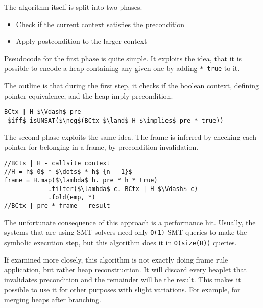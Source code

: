 \documentclass[sigplan,screen,review]{acmart}
\begin{document}
\begin{prooftree}
\end{prooftree}

The algorithm itself is split into two phases. 

\begin{itemize}
    \item Check if the current context satisfies the precondition
    \item Apply postcondition to the larger context
\end{itemize}

Pseudocode for the first phase is quite simple. It exploits the idea, that it is possible to encode a heap containing any given one by adding \texttt{* true} to it. 

The outline is that during the first step, it checks if the boolean context, defining pointer equivalence, and the heap imply precondition.

\begin{lstlisting}[mathescape]
BCtx | H $\Vdash$ pre 
 $iff$ isUNSAT($\neg$(BCtx $\land$ H $\implies$ pre * true))
\end{lstlisting}

The second phase exploits the same idea. The frame is inferred by checking each pointer for belonging in a frame, by precondition invalidation.

\begin{lstlisting}[mathescape]
//BCtx | H - callsite context
//H = h$_0$ * $\dots$ * h$_{n - 1}$
frame = H.map($\lambda$ h. pre * h * true)
            .filter($\lambda$ c. BCtx | H $\Vdash$ c)
            .fold(emp, *)
//BCtx | pre * frame - result

\end{lstlisting}

The unfortunate consequence of this approach is a performance hit. Usually, the systems that are using SMT solvers need only \texttt{O(1)} SMT queries to make the symbolic execution step, but this algorithm does it in \texttt{O(size(H))} queries. 

If examined more closely, this algorithm is not exactly doing frame rule application, but rather heap reconstruction. It will discard every heaplet that invalidates precondition and the remainder will be the result. This makes it possible to use it for other purposes with slight variations. For example, for merging heaps after branching. 
\end{document}
